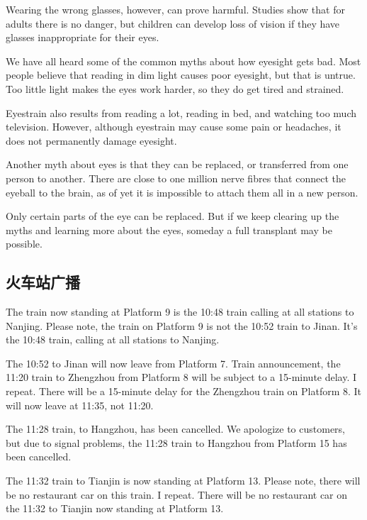 Wearing the wrong glasses, however, can prove harmful.
Studies show that for adults there is no danger, but
children can develop loss of vision if they have glasses inappropriate
for their eyes.

We have all heard some of the common myths about how
eyesight gets bad. Most people believe that reading in
dim light causes poor eyesight, but that is untrue. Too little
light makes the eyes work harder, so they do get tired and
strained.

Eyestrain also results from reading a lot, reading in bed,
and watching too much television. However, although
eyestrain may cause some pain or headaches, it does not
permanently damage eyesight.

Another myth about eyes is that they can be replaced, or
transferred from one person to another. There are close
to one million nerve fibres that connect the eyeball to the
brain, as of yet it is impossible to attach them all in a new
person.

Only certain parts of the eye can be replaced. But if
we keep clearing up the myths and learning more about
the eyes, someday a full transplant may be possible.
\subsection{火车站广播}
\begin{margintable}\vspace{-2cm}\footnotesize
\end{margintable}
The train now standing at Platform 9 is the 10:48 train
calling at all stations to Nanjing. Please note, the train on
Platform 9 is not the 10:52 train to Jinan. It's the 10:48 train,
calling at all stations to Nanjing.

The 10:52 to Jinan will now leave from Platform 7. Train
announcement, the 11:20 train to Zhengzhou from Platform
8 will be subject to a 15-minute delay. I repeat. There
will be a 15-minute delay for the Zhengzhou train on Platform
8. It will now leave at 11:35, not 11:20.

The 11:28 train, to Hangzhou, has been cancelled. We
apologize to customers, but due to signal problems,
the 11:28 train to Hangzhou from Platform 15 has been
cancelled.

The 11:32 train to Tianjin is now standing at Platform 13.
Please note, there will be no restaurant car on this train. I
repeat. There will be no restaurant car on the 11:32 to Tianjin
now standing at Platform 13.

